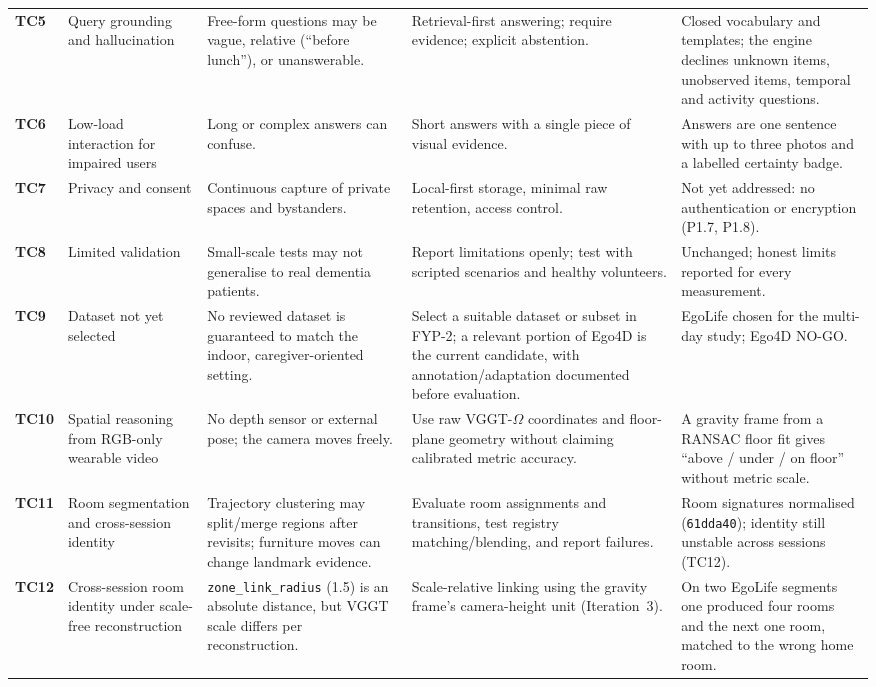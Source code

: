 \begin{ltab}
\begin{longtable}{@{}>{\bfseries}L{0.9cm}L{2.3cm}L{3.7cm}L{3.7cm}L{3.7cm}@{}}
TC5 & Query grounding and hallucination & Free-form questions may be vague,
relative (``before lunch''), or unanswerable. & Retrieval-first answering;
require evidence; explicit abstention. & Closed vocabulary and templates; the engine declines unknown items, unobserved items, temporal and activity questions.\\
TC6 & Low-load interaction for impaired users & Long or complex answers can
confuse. & Short answers with a single piece of visual evidence. & Answers are one sentence with up to three photos and a labelled certainty badge.\\
TC7 & Privacy and consent & Continuous capture of private spaces and
bystanders. & Local-first storage, minimal raw retention, access control. & Not yet addressed: no authentication or encryption (P1.7, P1.8).\\
TC8 & Limited validation & Small-scale tests may not generalise to real
dementia patients. & Report limitations openly; test with scripted scenarios
and healthy volunteers. & Unchanged; honest limits reported for every measurement.\\
TC9 & Dataset not yet selected & No reviewed dataset is guaranteed to match the indoor, caregiver-oriented setting. & Select a suitable dataset or subset in FYP-2; a relevant portion of Ego4D is the current candidate, with annotation/adaptation documented before evaluation. & EgoLife chosen for the multi-day study; Ego4D NO-GO.\\ 
TC10 & Spatial reasoning from RGB-only wearable video & No depth sensor or
external pose; the camera moves freely. & Use raw VGGT-$\Omega$ coordinates
and floor-plane geometry without claiming calibrated metric accuracy. & A gravity frame from a RANSAC floor fit \cite{ransac1981} gives ``above / under / on floor'' without metric scale.\\
TC11 & Room segmentation and cross-session identity & Trajectory clustering may
split/merge regions after revisits; furniture moves can change landmark evidence.
& Evaluate room assignments and transitions, test registry matching/blending,
and report failures. & Room signatures normalised (\texttt{61dda40}); identity still unstable across sessions (TC12).\\
TC12 & Cross-session room identity under scale-free reconstruction & \texttt{zone\_link\_radius} (1.5) is an absolute distance, but VGGT scale differs per reconstruction. & Scale-relative linking using the gravity frame's camera-height unit (Iteration~3). & On two EgoLife segments one produced four rooms and the next one room, matched to the wrong home room.\\
\end{longtable}
\end{ltab}

